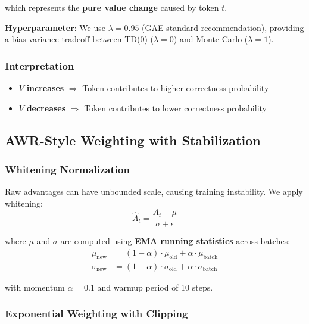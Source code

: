 which represents the \textbf{pure value change} caused by token $t$.

\textbf{Hyperparameter}: We use $\lambda = 0.95$ (GAE standard recommendation), providing a bias-variance tradeoff between TD(0) ($\lambda=0$) and Monte Carlo ($\lambda=1$).

\subsubsection{Interpretation}

\begin{itemize}[nosep]
    \item $V$ \textbf{increases} $\Rightarrow$ Token contributes to higher correctness probability
    \item $V$ \textbf{decreases} $\Rightarrow$ Token contributes to lower correctness probability
\end{itemize}

\subsection{AWR-Style Weighting with Stabilization}

\subsubsection{Whitening Normalization}

Raw advantages can have unbounded scale, causing training instability. We apply whitening:
\begin{equation}
    \hat{A}_t = \frac{A_t - \mu}{\sigma + \epsilon}
    \label{eq:whitening}
\end{equation}

where $\mu$ and $\sigma$ are computed using \textbf{EMA running statistics} across batches:
\begin{align}
    \mu_{\text{new}} &= (1 - \alpha) \cdot \mu_{\text{old}} + \alpha \cdot \mu_{\text{batch}} \\
    \sigma_{\text{new}} &= (1 - \alpha) \cdot \sigma_{\text{old}} + \alpha \cdot \sigma_{\text{batch}}
\end{align}

with momentum $\alpha = 0.1$ and warmup period of 10 steps.

\subsubsection{Exponential Weighting with Clipping}

